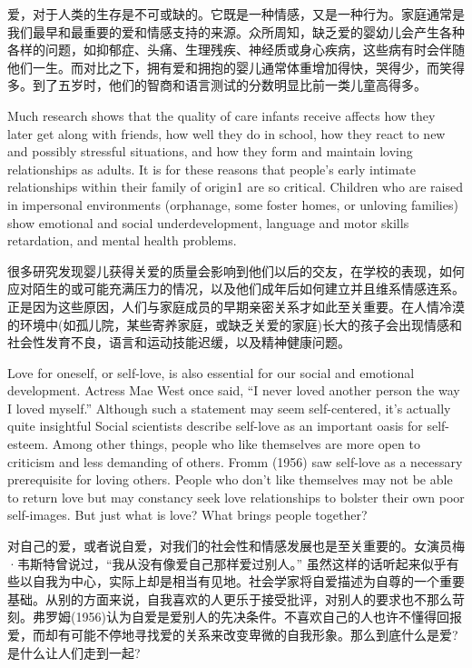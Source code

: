 \documentclass[cs4size, a4paper,12pt]{article}
\newcounter{numpar}
\newcommand*{\newpar}{\numpar{}}
\begin{document}
爱，对于人类的生存是不可或缺的。它既是一种情感，又是一种行为。家庭通常是我们最早和最重要的爱和情感支持的来源。众所周知，缺乏爱的婴幼儿会产生各种各样的问题，如抑郁症、头痛、生理残疾、神经质或身心疾病，这些病有时会伴随他们一生。而对比之下，拥有爱和拥抱的婴儿通常体重增加得快，哭得少，而笑得多。到了五岁时，他们的智商和语言测试的分数明显比前一类儿童高得多。

\newpar Much research shows that the quality of care infants receive affects how they later get along with friends, how well they do in school, how they react to new and possibly stressful situations, and how they form and maintain loving relationships as adults. It is for these reasons that people's early intimate relationships within their family of origin1 are so critical. Children who are raised in impersonal environments (orphanage, some foster homes, or unloving families) show emotional and social underdevelopment, language and motor skills retardation, and mental health problems.

很多研究发现婴儿获得关爱的质量会影响到他们以后的交友，在学校的表现，如何应对陌生的或可能充满压力的情况，以及他们成年后如何建立并且维系情感连系。正是因为这些原因，人们与家庭成员的早期亲密关系才如此至关重要。在人情冷漠的环境中(如孤儿院，某些寄养家庭，或缺乏关爱的家庭)长大的孩子会出现情感和社会性发育不良，语言和运动技能迟缓，以及精神健康问题。

\newpar Love for oneself, or self-love, is also essential for our social and emotional development. Actress Mae West once said, ``I never loved another person the way I loved myself.''  Although such a statement may seem self-centered, it's actually quite insightful Social scientists describe self-love as an important oasis for self- esteem. Among other things, people who like themselves are more open to criticism and less demanding of others. Fromm (1956) saw self-love as a necessary prerequisite for loving others. People who don't like themselves may not be able to return love but may constancy seek love relationships to bolster their own poor self-images. But just what is love? What brings people together?

对自己的爱，或者说自爱，对我们的社会性和情感发展也是至关重要的。女演员梅·韦斯特曾说过，``我从没有像爱自己那样爱过别人。'' 虽然这样的话听起来似乎有些以自我为中心，实际上却是相当有见地。社会学家将自爱描述为自尊的一个重要基础。从别的方面来说，自我喜欢的人更乐于接受批评，对别人的要求也不那么苛刻。弗罗姆(1956)认为自爱是爱别人的先决条件。不喜欢自己的人也许不懂得回报爱，而却有可能不停地寻找爱的关系来改变卑微的自我形象。那么到底什么是爱?是什么让人们走到一起?
\end{document}
